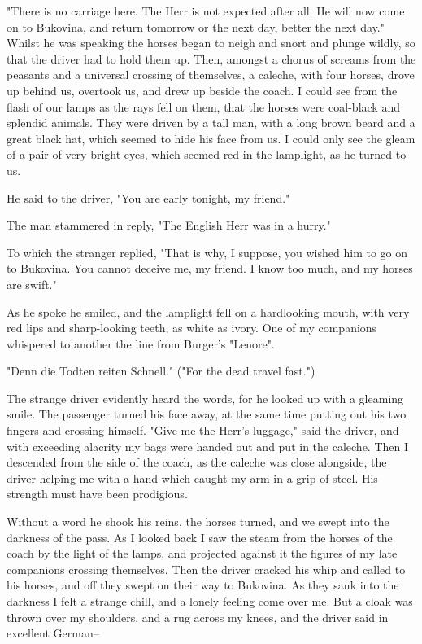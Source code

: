 "There is no carriage here. The Herr is not expected after all. He will now come on to Bukovina, and return tomorrow or the next day, better the next day." Whilst he was speaking the horses began to neigh and snort and plunge wildly, so that the driver had to hold them up. Then, amongst a chorus of screams from the peasants and a universal crossing of themselves, a caleche, with four horses, drove up behind us, overtook us, and drew up beside the coach. I could see from the flash of our lamps as the rays fell on them, that the horses were coal-black and splendid animals. They were driven by a tall man, with a long brown beard and a great black hat, which seemed to hide his face from us. I could only see the gleam of a pair of very bright eyes, which seemed red in the lamplight, as he turned to us.

He said to the driver, "You are early tonight, my friend."

The man stammered in reply, "The English Herr was in a hurry."

To which the stranger replied, "That is why, I suppose, you wished him to go on to Bukovina. You cannot deceive me, my friend. I know too much, and my horses are swift."

As he spoke he smiled, and the lamplight fell on a hardlooking mouth, with very red lips and sharp-looking teeth, as white as ivory. One of my companions whispered to another the line from Burger's "Lenore".

"Denn die Todten reiten Schnell." ("For the dead travel fast.")

The strange driver evidently heard the words, for he looked up with a gleaming smile. The passenger turned his face away, at the same time putting out his two fingers and crossing himself. "Give me the Herr's luggage," said the driver, and with exceeding alacrity my bags were handed out and put in the caleche. Then I descended from the side of the coach, as the caleche was close alongside, the driver helping me with a hand which caught my arm in a grip of steel. His strength must have been prodigious.

Without a word he shook his reins, the horses turned, and we swept into the darkness of the pass. As I looked back I saw the steam from the horses of the coach by the light of the lamps, and projected against it the figures of my late companions crossing themselves. Then the driver cracked his whip and called to his horses, and off they swept on their way to Bukovina. As they sank into the darkness I felt a strange chill, and a lonely feeling come over me. But a cloak was thrown over my shoulders, and a rug across my knees, and the driver said in excellent German--

